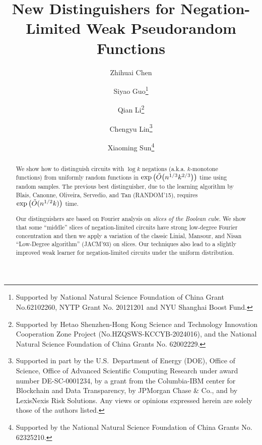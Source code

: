 \documentclass{toc}
\begin{document}
\begin{frontmatter}%

%
%
%

%
\title{New Distinguishers for Negation-Limited Weak Pseudorandom Functions}  %

%
%

%
%
%
%
%
%

%
%
%
%
%
%
%
%
%
%
%
%


%
%
%
%

%

\author[chen]{Zhihuai Chen}
%
\author[guo]{Siyao Guo\thanks{Supported by National Natural Science Foundation of China Grant No.62102260, NYTP Grant No. 20121201 and NYU Shanghai Boost Fund.}} %
%
\author[li]{Qian Li\thanks{Supported by Hetao Shenzhen-Hong Kong Science and Technology Innovation Cooperation Zone Project (No.HZQSWS-KCCYB-2024016), and the National Natural Science Foundation of China Grants No. 62002229.}} %
\author[lin]{Chengyu Lin\thanks{Supported in part by the U.S.~Department of Energy (DOE), Office of Science, Office of Advanced Scientific Computing Research under award number DE-SC-0001234, by a grant from the Columbia-IBM center for Blockchain and Data Transparency, by JPMorgan Chase \& Co., and by LexisNexis Risk Solutions. Any views or opinions expressed herein are solely those of the authors listed.}}
\author[sun]{Xiaoming Sun\thanks{Supported by the National Natural Science Foundation of China Grants No. 62325210.}}

%
%
%
%

%
%
%
%
%
%
%
%
\begin{abstract}
We show how to distinguish circuits with $\log k$ negations (a.k.a. $k$-monotone functions) from uniformly random functions in  $\exp\big(\Tilde{O}\big(n^{1/3}k^{2/3}\big)\big)$ time using random samples. The previous best distinguisher, due to the learning algorithm by Blais, %
Canonne, %
Oliveira, Servedio, and Tan (RANDOM'15), requires $\exp\big(\Tilde{O}(n^{1/2} k)\big)$ time.

Our distinguishers are based on Fourier analysis on \emph{slices of the Boolean cube}. We show that some ``middle'' slices of negation-limited circuits have strong low-degree Fourier concentration and then we apply a variation of the classic Linial, Mansour, and Nisan ``Low-Degree algorithm'' (JACM'93) on slices. Our techniques also lead to a slightly improved weak learner for negation-limited %
circuits under the uniform distribution.
\end{abstract}

%

\end{frontmatter}
\end{document}
